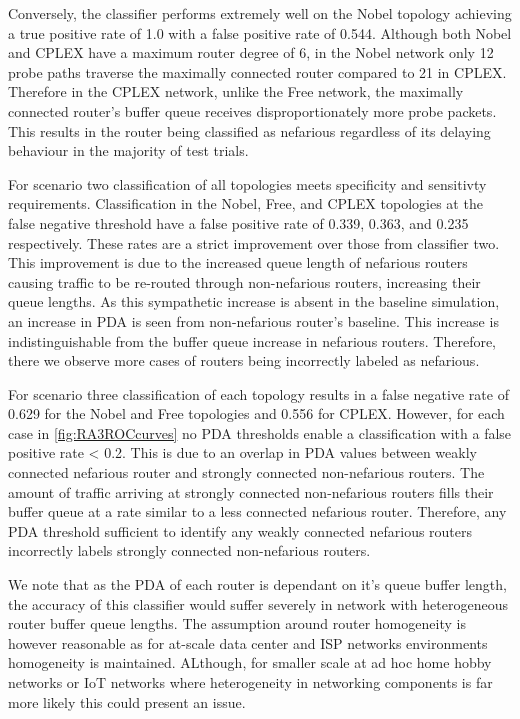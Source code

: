 Conversely, the classifier performs extremely well on the Nobel topology achieving a true positive rate of 1.0 with a false positive rate of 0.544. Although both Nobel and CPLEX have a maximum router degree of 6, in the Nobel network only 12 probe paths traverse the maximally connected router compared to 21 in CPLEX. Therefore in the CPLEX network, unlike the Free network, the maximally connected router's buffer queue receives disproportionately more probe packets. This results in the router being classified as nefarious regardless of its delaying behaviour in the majority of test trials.\par
For scenario two classification of all topologies meets specificity and sensitivty requirements. Classification in the Nobel, Free, and CPLEX topologies at the false negative threshold have a false positive rate of 0.339, 0.363, and 0.235 respectively. These rates are a strict improvement over those from classifier two. This improvement is due to the increased queue length of nefarious routers causing traffic to be re-routed through non-nefarious routers, increasing their queue lengths. As this sympathetic increase is absent in the baseline simulation, an increase in PDA is seen from non-nefarious router's baseline. This increase is indistinguishable from the buffer queue increase in nefarious routers. Therefore, there we observe more cases of routers being incorrectly labeled as nefarious.\par
For scenario three classification of each topology results in a false negative rate of 0.629 for the Nobel and Free topologies and 0.556 for CPLEX. However, for each case in \cref{fig:RA3ROCcurves} no PDA thresholds enable a classification with a false positive rate < 0.2. This is due to an overlap in PDA values between weakly connected nefarious router and strongly connected non-nefarious routers. The amount of traffic arriving at strongly connected non-nefarious routers fills their buffer queue at a rate similar to a less connected nefarious router. Therefore, any PDA threshold sufficient to identify any weakly connected nefarious routers incorrectly labels strongly connected non-nefarious routers.\par
We note that as the PDA of each router is dependant on it's queue buffer length, the accuracy of this classifier would suffer severely in network with heterogeneous router buffer queue lengths. The assumption around router homogeneity is however reasonable as for at-scale data center and ISP networks environments homogeneity is maintained. ALthough, for smaller scale at ad hoc home hobby networks or IoT networks where heterogeneity in networking components is far more likely this could present an issue. 

